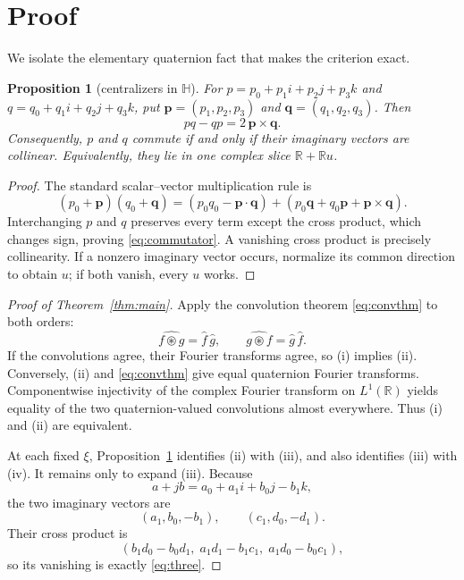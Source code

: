 \documentclass[11pt]{article}
\newtheorem{proposition}[theorem]{Proposition}
\newcommand{\Hq}{\mathbb H}
\newcommand{\R}{\mathbb R}
\newcommand{\ostar}{\mathbin{\circledast}}
\begin{document}
\section{Proof}

We isolate the elementary quaternion fact that makes the criterion exact.

\begin{proposition}[centralizers in $\Hq$]\label{prop:quaternion}
For $p=p_0+p_1i+p_2j+p_3k$ and
$q=q_0+q_1i+q_2j+q_3k$, put
$\mathbf p=(p_1,p_2,p_3)$ and $\mathbf q=(q_1,q_2,q_3)$.  Then
\begin{equation}\label{eq:commutator}
                pq-qp=2\,\mathbf p\times\mathbf q.
\end{equation}
Consequently, $p$ and $q$ commute if and only if their imaginary vectors are
collinear.  Equivalently, they lie in one complex slice $\R+\R u$.
\end{proposition}

\begin{proof}
The standard scalar--vector multiplication rule is
\[
(p_0+\mathbf p)(q_0+\mathbf q)
=(p_0q_0-\mathbf p\!\cdot\!\mathbf q)
 +(p_0\mathbf q+q_0\mathbf p+\mathbf p\times\mathbf q).
\]
Interchanging $p$ and $q$ preserves every term except the cross product,
which changes sign, proving \eqref{eq:commutator}.  A vanishing cross product
is precisely collinearity.  If a nonzero imaginary vector occurs, normalize
its common direction to obtain $u$; if both vanish, every $u$ works.
\end{proof}

\begin{proof}[Proof of Theorem~\ref{thm:main}]
Apply the convolution theorem \eqref{eq:convthm} to both orders:
\begin{equation}\label{eq:bothorders}
 \widehat{f\ostar g}=\widehat f\,\widehat g,
 \qquad
 \widehat{g\ostar f}=\widehat g\,\widehat f.
\end{equation}
If the convolutions agree, their Fourier transforms agree, so (i) implies
(ii).  Conversely, (ii) and \eqref{eq:convthm} give equal quaternion Fourier
transforms.  Componentwise injectivity of the complex Fourier transform on
$L^1(\R)$ yields equality of the two quaternion-valued convolutions almost
everywhere.  Thus (i) and (ii) are equivalent.

At each fixed $\xi$, Proposition~\ref{prop:quaternion} identifies (ii) with
(iii), and also identifies (iii) with (iv).  It remains only to expand (iii).
Because
\[
a+jb=a_0+a_1i+b_0j-b_1k,
\]
the two imaginary vectors are
\[
       (a_1,b_0,-b_1),\qquad(c_1,d_0,-d_1).
\]
Their cross product is
\[
 (b_1d_0-b_0d_1,\;a_1d_1-b_1c_1,\;a_1d_0-b_0c_1),
\]
so its vanishing is exactly \eqref{eq:three}.
\end{proof}
\end{document}
